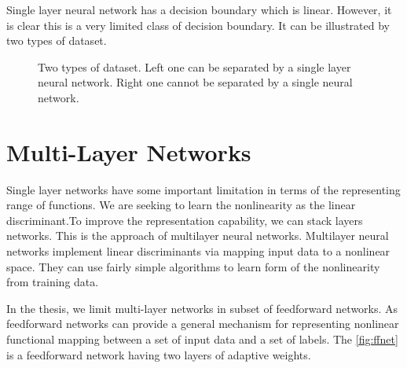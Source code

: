 Single layer neural network has a decision boundary which is linear. However, it is clear this is a very limited class of decision boundary. It can be illustrated by two types of dataset.
\graphicspath{ {./Figures/} }
\begin{figure}[!htb]
\centering     %
{}
\caption{Two types of dataset. Left one can be separated by a single layer neural network. Right one cannot be separated by a single neural network.}
\end{figure}

\section{Multi-Layer Networks}

Single layer networks have some important limitation in terms of the representing range of functions. We are seeking to learn the nonlinearity as the linear discriminant.To improve the representation capability, we can stack layers networks. This is the approach of multilayer neural networks. Multilayer neural networks implement linear discriminants via mapping input data to a nonlinear space. They can use fairly simple algorithms to learn form of the nonlinearity from training data.

In the thesis, we limit multi-layer networks in subset of feedforward networks. As feedforward networks can provide a general mechanism for representing nonlinear functional mapping between a set of input data and a set of labels. The \ref{fig:ffnet} is a feedforward network having two layers of adaptive weights.

